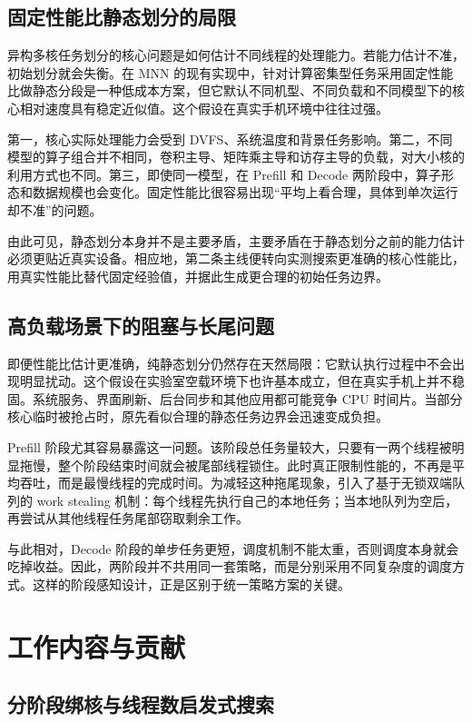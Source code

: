 \subsection{固定性能比静态划分的局限}

异构多核任务划分的核心问题是如何估计不同线程的处理能力。若能力估计不准，初始划分就会失衡。在 MNN 的现有实现中，针对计算密集型任务采用固定性能比做静态分段是一种低成本方案，但它默认不同机型、不同负载和不同模型下的核心相对速度具有稳定近似值。这个假设在真实手机环境中往往过强。

第一，核心实际处理能力会受到 DVFS、系统温度和背景任务影响。第二，不同模型的算子组合并不相同，卷积主导、矩阵乘主导和访存主导的负载，对大小核的利用方式也不同。第三，即使同一模型，在 Prefill 和 Decode 两阶段中，算子形态和数据规模也会变化。固定性能比很容易出现“平均上看合理，具体到单次运行却不准”的问题。

由此可见，静态划分本身并不是主要矛盾，主要矛盾在于静态划分之前的能力估计必须更贴近真实设备。相应地，第二条主线便转向实测搜索更准确的核心性能比，用真实性能比替代固定经验值，并据此生成更合理的初始任务边界。

\subsection{高负载场景下的阻塞与长尾问题}

即便性能比估计更准确，纯静态划分仍然存在天然局限：它默认执行过程中不会出现明显扰动。这个假设在实验室空载环境下也许基本成立，但在真实手机上并不稳固。系统服务、界面刷新、后台同步和其他应用都可能竞争 CPU 时间片。当部分核心临时被抢占时，原先看似合理的静态任务边界会迅速变成负担。

Prefill 阶段尤其容易暴露这一问题。该阶段总任务量较大，只要有一两个线程被明显拖慢，整个阶段结束时间就会被尾部线程锁住。此时真正限制性能的，不再是平均吞吐，而是最慢线程的完成时间。为减轻这种拖尾现象，引入了基于无锁双端队列的 work stealing 机制：每个线程先执行自己的本地任务；当本地队列为空后，再尝试从其他线程任务尾部窃取剩余工作。

与此相对，Decode 阶段的单步任务更短，调度机制不能太重，否则调度本身就会吃掉收益。因此，两阶段并不共用同一套策略，而是分别采用不同复杂度的调度方式。这样的阶段感知设计，正是区别于统一策略方案的关键。

\section{工作内容与贡献}

\subsection{分阶段绑核与线程数启发式搜索}

